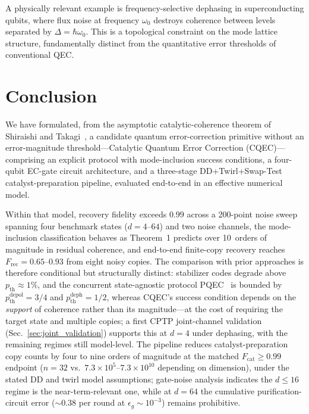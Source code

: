 \documentclass[pra,twocolumn,superscriptaddress,longbibliography,floatfix]{revtex4-2}
\begin{document}
A physically relevant example is frequency-selective dephasing in superconducting qubits, where flux noise at frequency $\omega_0$ destroys coherence between levels separated by $\Delta = \hbar\omega_0$.
This is a topological constraint on the mode lattice structure, fundamentally distinct from the quantitative error thresholds of conventional QEC.


\section{Conclusion}
\label{sec:conclusion}

We have formulated, from the asymptotic catalytic-coherence theorem of Shiraishi and Takagi~\cite{Shiraishi2024}, a candidate quantum error-correction primitive without an error-magnitude threshold---Catalytic Quantum Error Correction (CQEC)---comprising an explicit protocol with mode-inclusion success conditions, a four-qubit EC-gate circuit architecture, and a three-stage DD+Twirl+Swap-Test catalyst-preparation pipeline, evaluated end-to-end in an effective numerical model.

Within that model, recovery fidelity exceeds $0.99$ across a 200-point noise sweep spanning four benchmark states ($d = 4$--$64$) and two noise channels, the mode-inclusion classification behaves as Theorem~1 predicts over 10~orders of magnitude in residual coherence, and end-to-end finite-copy recovery reaches $F_\mathrm{rec} = 0.65$--$0.93$ from eight noisy copies.
The comparison with prior approaches is therefore conditional but structurally distinct: stabilizer codes degrade above $p_\mathrm{th} \approx 1\%$, and the concurrent state-agnostic protocol PQEC~\cite{Raghoonanan2026} is bounded by $p_\mathrm{th}^\mathrm{depol} = 3/4$ and $p_\mathrm{th}^\mathrm{deph} = 1/2$, whereas CQEC's success condition depends on the \emph{support} of coherence rather than its magnitude---at the cost of requiring the target state and multiple copies; a first CPTP joint-channel validation (Sec.~\ref{sec:joint_validation}) supports this at $d = 4$ under dephasing, with the remaining regimes still model-level.
The pipeline reduces catalyst-preparation copy counts by four to nine orders of magnitude at the matched $F_\mathrm{cat} \geq 0.99$ endpoint ($n = 32$ vs.\ $7.3 \times 10^{5}$--$7.3 \times 10^{10}$ depending on dimension), under the stated DD and twirl model assumptions; gate-noise analysis indicates the $d \leq 16$ regime is the near-term-relevant one, while at $d = 64$ the cumulative purification-circuit error ($\sim\!0.38$ per round at $\epsilon_g \sim 10^{-3}$) remains prohibitive.
\end{document}
